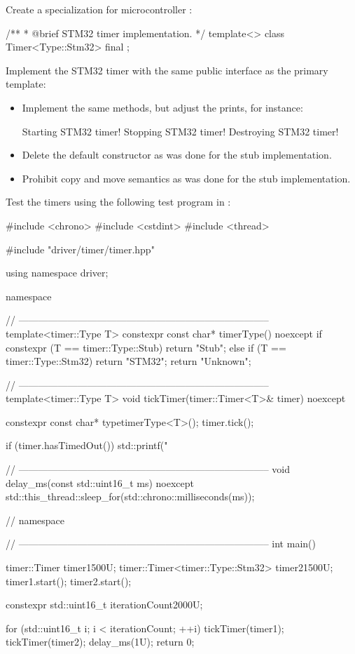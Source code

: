 \begin{parts}
  \item Create a specialization for microcontroller :
\begin{cppcode}
/**
 * @brief STM32 timer implementation.
 */
template<>
class Timer<Type::Stm32> final
{
};
\end{cppcode}

  \item Implement the STM32 timer with the same public interface as the primary template:
  \begin{itemize}
    \item Implement the same methods, but adjust the prints, for instance:
\begin{console}
Starting STM32 timer!
Stopping STM32 timer!
Destroying STM32 timer!
\end{console}
    \item Delete the default constructor as was done for the stub implementation.
    \item Prohibit copy and move semantics as was done for the stub implementation.
  \end{itemize}
\end{parts}

Test the timers using the following test program in :

\begin{cppcode}
#include <chrono>
#include <cstdint>
#include <thread>

#include "driver/timer/timer.hpp"

using namespace driver;

namespace
{
// -----------------------------------------------------------------------------
template<timer::Type T>
constexpr const char* timerType() noexcept
{
    if constexpr (T == timer::Type::Stub) { return "Stub"; }
    else if (T == timer::Type::Stm32) { return "STM32"; }
    return "Unknown";
}

// -----------------------------------------------------------------------------
template<timer::Type T>
void tickTimer(timer::Timer<T>& timer) noexcept
{
    constexpr const char* type{timerType<T>()};
    timer.tick();

    if (timer.hasTimedOut())
    {
        std::printf("%
    }
}

// -----------------------------------------------------------------------------
void delay_ms(const std::uint16_t ms) noexcept
{
    std::this_thread::sleep_for(std::chrono::milliseconds(ms));
}
} // namespace

// -----------------------------------------------------------------------------
int main()
{
    timer::Timer timer1{500U};
    timer::Timer<timer::Type::Stm32> timer2{1500U};
    timer1.start();
    timer2.start();

    constexpr std::uint16_t iterationCount{2000U};

    for (std::uint16_t i{}; i < iterationCount; ++i)
    {
        tickTimer(timer1);
        tickTimer(timer2);
        delay_ms(1U);
    }
    return 0;
}
\end{cppcode}

